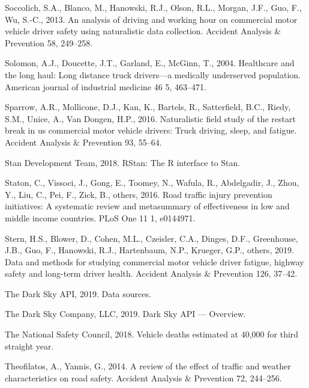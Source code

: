 \documentclass[12pt]{book}
\numberwithin{equation}{chapter}
\begin{document}
\leavevmode\hypertarget{ref-soccolich2013analysis}{}%
Soccolich, S.A., Blanco, M., Hanowski, R.J., Olson, R.L., Morgan, J.F., Guo, F., Wu, S.-C., 2013. An analysis of driving and working hour on commercial motor vehicle driver safety using naturalistic data collection. Accident Analysis \& Prevention 58, 249--258.

\leavevmode\hypertarget{ref-solomon2004healthcare}{}%
Solomon, A.J., Doucette, J.T., Garland, E., McGinn, T., 2004. Healthcare and the long haul: Long distance truck drivers---a medically underserved population. American journal of industrial medicine 46 5, 463--471.

\leavevmode\hypertarget{ref-sparrow2016naturalistic}{}%
Sparrow, A.R., Mollicone, D.J., Kan, K., Bartels, R., Satterfield, B.C., Riedy, S.M., Unice, A., Van Dongen, H.P., 2016. Naturalistic field study of the restart break in us commercial motor vehicle drivers: Truck driving, sleep, and fatigue. Accident Analysis \& Prevention 93, 55--64.

\leavevmode\hypertarget{ref-rstancitation}{}%
Stan Development Team, 2018. RStan: The R interface to Stan.

\leavevmode\hypertarget{ref-staton2016road}{}%
Staton, C., Vissoci, J., Gong, E., Toomey, N., Wafula, R., Abdelgadir, J., Zhou, Y., Liu, C., Pei, F., Zick, B., others, 2016. Road traffic injury prevention initiatives: A systematic review and metasummary of effectiveness in low and middle income countries. PLoS One 11 1, e0144971.

\leavevmode\hypertarget{ref-stern2019data}{}%
Stern, H.S., Blower, D., Cohen, M.L., Czeisler, C.A., Dinges, D.F., Greenhouse, J.B., Guo, F., Hanowski, R.J., Hartenbaum, N.P., Krueger, G.P., others, 2019. Data and methods for studying commercial motor vehicle driver fatigue, highway safety and long-term driver health. Accident Analysis \& Prevention 126, 37--42.

\leavevmode\hypertarget{ref-darkskyds}{}%
The Dark Sky API, 2019. Data sources.

\leavevmode\hypertarget{ref-darksky}{}%
The Dark Sky Company, LLC, 2019. Dark Sky API --- Overview.

\leavevmode\hypertarget{ref-nsc2018}{}%
The National Safety Council, 2018. Vehicle deaths estimated at 40,000 for third straight year.

\leavevmode\hypertarget{ref-theofilatos2014review}{}%
Theofilatos, A., Yannis, G., 2014. A review of the effect of traffic and weather characteristics on road safety. Accident Analysis \& Prevention 72, 244--256.
\end{document}
